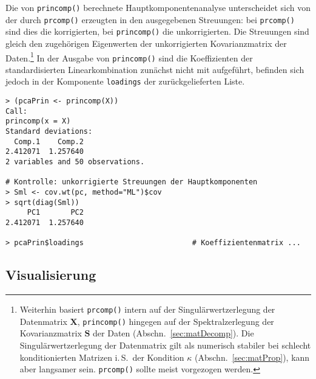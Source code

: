 Die von \lstinline!princomp()! berechnete Hauptkomponentenanalyse unterscheidet sich von der durch \lstinline!prcomp()! erzeugten in den ausgegebenen Streuungen: bei \lstinline!prcomp()! sind dies die korrigierten, bei \lstinline!princomp()! die unkorrigierten. Die Streuungen sind gleich den zugehörigen Eigenwerten der unkorrigierten Kovarianzmatrix der Daten.\footnote{Weiterhin basiert \lstinline!prcomp()! intern auf der Singulärwertzerlegung der Datenmatrix $\bm{X}$, \lstinline!princomp()! hingegen auf der Spektralzerlegung der Kovarianzmatrix $\bm{S}$ der Daten (Abschn.\ \ref{sec:matDecomp}). Die Singulärwertzerlegung der Datenmatrix gilt als numerisch stabiler bei schlecht konditionierten Matrizen i.\,S.\ der Kondition $\kappa$ (Abschn.\ \ref{sec:matProp}), kann aber langsamer sein. \lstinline!prcomp()! sollte meist vorgezogen werden.} In der Ausgabe von \lstinline!princomp()! sind die Koeffizienten der standardisierten Linearkombination zunächst nicht mit aufgeführt, befinden sich jedoch in der Komponente \lstinline!loadings! der zurückgelieferten Liste.
\begin{lstlisting}
> (pcaPrin <- princomp(X))
Call:
princomp(x = X)
Standard deviations:
  Comp.1    Comp.2
2.412071  1.257640
2 variables and 50 observations.

# Kontrolle: unkorrigierte Streuungen der Hauptkomponenten
> Sml <- cov.wt(pc, method="ML")$cov
> sqrt(diag(Sml))
     PC1       PC2
2.412071  1.257640

> pcaPrin$loadings                         # Koeffizientenmatrix ...
\end{lstlisting}

\subsection{Visualisierung}
\label{sec:pcaDiag}

